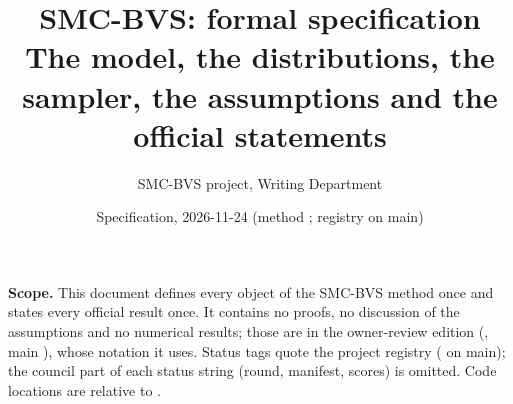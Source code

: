 \documentclass[11pt]{article}
\title{SMC-BVS: formal specification\\[2pt]
\large The model, the distributions, the sampler, the assumptions and the official statements}
\author{SMC-BVS project, Writing Department}
\date{Specification, 2026-11-24 (method \code{method-v3.1.1-listpip}; registry on main)}
\theoremstyle{plain}
\theoremstyle{remark}
\begin{document}
\maketitle

\noindent\textbf{Scope.} This document defines every object of the SMC-BVS method once and states every official result
once. It contains no proofs, no discussion of the assumptions and no numerical results; those are in the owner-review
edition (, main ), whose notation it uses. Status tags quote the project
registry ( on main); the council part of each status string (round, manifest,
scores) is omitted. Code locations are relative to .

\tableofcontents









\appendix


\end{document}
